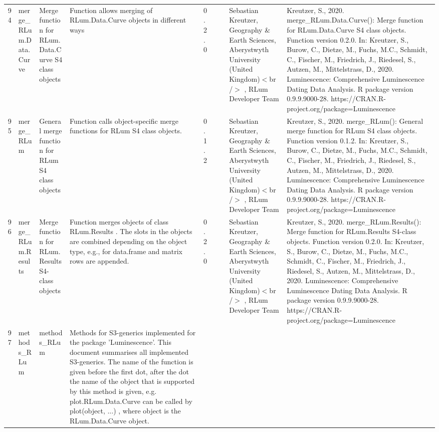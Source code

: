 \begin{table}[ht]
\begin{tabular}{rllllllll}
  94 & merge\_RLum.Data.Curve & Merge function for RLum.Data.Curve S4 class objects & Function allows merging of RLum.Data.Curve objects in different ways & 0.2.0
 &  &  & Sebastian Kreutzer, Geography \& Earth Sciences, Aberystwyth University (United Kingdom)$<$br /$>$ , RLum Developer Team & Kreutzer, S., 2020. merge\_RLum.Data.Curve(): Merge function for RLum.Data.Curve S4 class objects. Function version 0.2.0. In: Kreutzer, S., Burow, C., Dietze, M., Fuchs, M.C., Schmidt, C., Fischer, M., Friedrich, J., Riedesel, S., Autzen, M., Mittelstrass, D., 2020. Luminescence: Comprehensive Luminescence Dating Data Analysis. R package version 0.9.9.9000-28. https://CRAN.R-project.org/package=Luminescence
 \\ 
  95 & merge\_RLum & General merge function for RLum S4 class objects & Function calls object-specific merge functions for RLum S4 class objects. & 0.1.2
 &  &  & Sebastian Kreutzer, Geography \& Earth Sciences, Aberystwyth University (United Kingdom)$<$br /$>$ , RLum Developer Team & Kreutzer, S., 2020. merge\_RLum(): General merge function for RLum S4 class objects. Function version 0.1.2. In: Kreutzer, S., Burow, C., Dietze, M., Fuchs, M.C., Schmidt, C., Fischer, M., Friedrich, J., Riedesel, S., Autzen, M., Mittelstrass, D., 2020. Luminescence: Comprehensive Luminescence Dating Data Analysis. R package version 0.9.9.9000-28. https://CRAN.R-project.org/package=Luminescence
 \\ 
  96 & merge\_RLum.Results & Merge function for RLum.Results S4-class objects & Function merges objects of class  RLum.Results . The slots in the objects are combined depending on the object type, e.g., for  data.frame  and  matrix  rows are appended. & 0.2.0
 &  &  & Sebastian Kreutzer, Geography \& Earth Sciences, Aberystwyth University (United Kingdom)$<$br /$>$ , RLum Developer Team & Kreutzer, S., 2020. merge\_RLum.Results(): Merge function for RLum.Results S4-class objects. Function version 0.2.0. In: Kreutzer, S., Burow, C., Dietze, M., Fuchs, M.C., Schmidt, C., Fischer, M., Friedrich, J., Riedesel, S., Autzen, M., Mittelstrass, D., 2020. Luminescence: Comprehensive Luminescence Dating Data Analysis. R package version 0.9.9.9000-28. https://CRAN.R-project.org/package=Luminescence
 \\ 
  97 & methods\_RLum & methods\_RLum & Methods for S3-generics implemented for the package 'Luminescence'. This document summarises all implemented S3-generics. The name of the function is given before the first dot, after the dot the name of the object that is supported by this method is given, e.g.  plot.RLum.Data.Curve  can be called by  plot(object, ...) , where  object  is the  RLum.Data.Curve  object. &  &  &  &  &  \\ 

\end{tabular}
\end{table}
